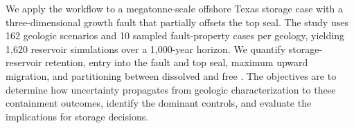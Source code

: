 We apply the workflow to a megatonne-scale offshore Texas storage case with a
three-dimensional growth fault that partially offsets the top seal. The study
uses 162 geologic scenarios and 10 sampled fault-property cases per geology,
yielding 1,620 reservoir simulations over a 1,000-year horizon. We quantify
storage-reservoir retention, entry into the fault and top seal, maximum upward
migration, and partitioning between dissolved and free \coTwo{}. The objectives
are to determine how uncertainty propagates from geologic characterization to
these containment outcomes, identify the dominant controls, and evaluate the
implications for storage decisions. 
